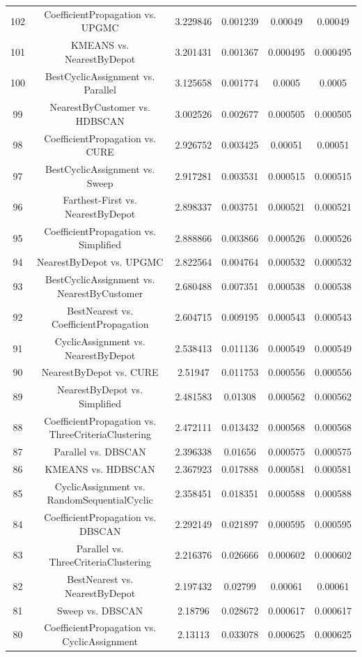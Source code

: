 \documentclass[a4paper,10pt]{article}
\begin{document}
\begin{landscape}
\begin{table}[!htp]
\begin{tabular}{cccccc}
102&CoefficientPropagation vs. UPGMC&3.229846&0.001239&0.00049&0.00049\\
101&KMEANS vs. NearestByDepot&3.201431&0.001367&0.000495&0.000495\\
100&BestCyclicAssignment vs. Parallel&3.125658&0.001774&0.0005&0.0005\\
99&NearestByCustomer vs. HDBSCAN&3.002526&0.002677&0.000505&0.000505\\
98&CoefficientPropagation vs. CURE&2.926752&0.003425&0.00051&0.00051\\
97&BestCyclicAssignment vs. Sweep&2.917281&0.003531&0.000515&0.000515\\
96&Farthest-First vs. NearestByDepot&2.898337&0.003751&0.000521&0.000521\\
95&CoefficientPropagation vs. Simplified&2.888866&0.003866&0.000526&0.000526\\
94&NearestByDepot vs. UPGMC&2.822564&0.004764&0.000532&0.000532\\
93&BestCyclicAssignment vs. NearestByCustomer&2.680488&0.007351&0.000538&0.000538\\
92&BestNearest vs. CoefficientPropagation&2.604715&0.009195&0.000543&0.000543\\
91&CyclicAssignment vs. NearestByDepot&2.538413&0.011136&0.000549&0.000549\\
90&NearestByDepot vs. CURE&2.51947&0.011753&0.000556&0.000556\\
89&NearestByDepot vs. Simplified&2.481583&0.01308&0.000562&0.000562\\
88&CoefficientPropagation vs. ThreeCriteriaClustering&2.472111&0.013432&0.000568&0.000568\\
87&Parallel vs. DBSCAN&2.396338&0.01656&0.000575&0.000575\\
86&KMEANS vs. HDBSCAN&2.367923&0.017888&0.000581&0.000581\\
85&CyclicAssignment vs. RandomSequentialCyclic&2.358451&0.018351&0.000588&0.000588\\
84&CoefficientPropagation vs. DBSCAN&2.292149&0.021897&0.000595&0.000595\\
83&Parallel vs. ThreeCriteriaClustering&2.216376&0.026666&0.000602&0.000602\\
82&BestNearest vs. NearestByDepot&2.197432&0.02799&0.00061&0.00061\\
81&Sweep vs. DBSCAN&2.18796&0.028672&0.000617&0.000617\\
80&CoefficientPropagation vs. CyclicAssignment&2.13113&0.033078&0.000625&0.000625\\

\end{tabular}
\end{table}
\end{landscape}
\end{document}
